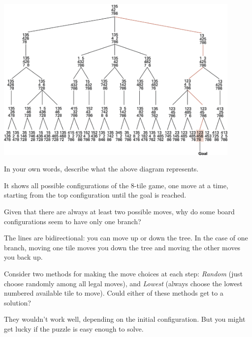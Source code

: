 

\begin{center}
\includegraphics[width=0.9\textwidth]{CSP/search-tree1.png}
\end{center}




\Q In your own words, describe what the above diagram represents.

\begin{answer}
It shows all possible configurations of the 8-tile game, one move at a time, starting from the top configuration until the goal is reached.
\end{answer}


\Q Given that there are always at least two possible moves, why do some board configurations seem to have only one branch?

\begin{answer}
The lines are bidirectional: you can move up or down the tree.
In the case of one branch, moving one tile moves you down the tree and moving the other moves you back up.
\end{answer}


\Q \label{guess} Consider two methods for making the move choices at each step:
\emph{Random} (just choose randomly among all legal moves), and
\emph{Lowest} (always choose the lowest numbered available tile to move).
Could either of these methods get to a solution?

\begin{answer}
They wouldn't work well, depending on the initial configuration.
But you might get lucky if the puzzle is easy enough to solve.
\end{answer}


